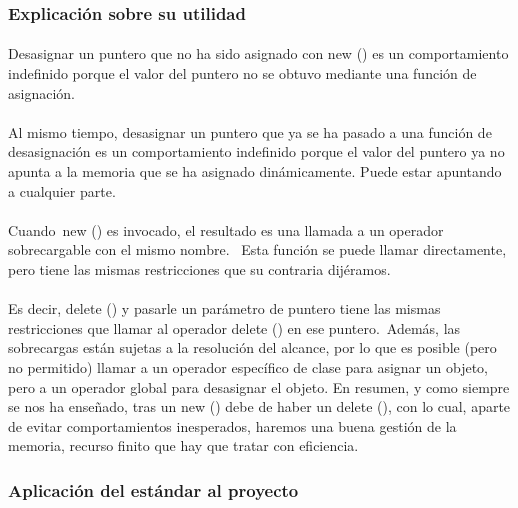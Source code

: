 		\subsubsection{Explicación sobre su utilidad}
		
			\paragraph{}Desasignar un puntero que no ha sido asignado con new () es un comportamiento indefinido porque el valor del puntero no se obtuvo mediante una función de asignación.
			
			\paragraph{}Al mismo tiempo, desasignar un puntero que ya se ha pasado a una función de desasignación es un comportamiento indefinido porque el valor del puntero ya no apunta a la memoria que se ha asignado dinámicamente. Puede estar apuntando a cualquier parte.
			
			\paragraph{}Cuando new () es invocado, el resultado es una llamada a un operador sobrecargable con el mismo nombre.  Esta función se puede llamar directamente, pero tiene las mismas restricciones que su contraria dijéramos.
			
			\paragraph{}Es decir, delete () y pasarle un parámetro de puntero tiene las mismas restricciones que llamar al operador delete () en ese puntero. Además, las sobrecargas están sujetas a la resolución del alcance, por lo que es posible (pero no permitido) llamar a un operador específico de clase para asignar un objeto, pero a un operador global para desasignar el objeto. En resumen, y como siempre se nos ha enseñado, tras un new () debe de haber un delete (), con lo cual, aparte de evitar comportamientos inesperados, haremos una buena gestión de la memoria, recurso finito que hay que tratar con eficiencia.
		
		\subsubsection{Aplicación del estándar al proyecto}
		
